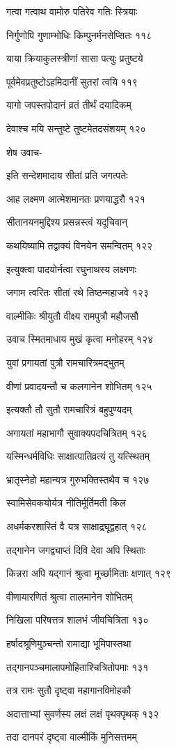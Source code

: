 गत्वा गत्वाथ वामोरु पतिरेव गतिः स्त्रियाः

निर्गुणोपि गुणाम्भोधिः किम्पुनर्मनसेप्सितः ११८

याया क्रियाकुलस्त्रीणां सासा पत्युः प्रतुष्टये

पूर्वमेवप्रतुष्टोऽहमिदानीं सुतरां त्वयि ११९

यागो जपस्तपोदानं व्रतं तीर्थं दयादिकम्

देवाश्च मयि सन्तुष्टे तुष्टमेतदसंशयम् १२०

शेष उवाच-

इति सन्देशमादाय सीतां प्रति जगत्पतेः

आह लक्ष्मण आत्मेशमानतः प्रणयाद्धरौ १२१

सीतानयनमुद्दिश्य प्रसन्नस्त्वं यदूचिवान्

कथयिष्यामि तद्वाक्यं विनयेन समन्वितम् १२२

इत्युक्त्वा पादयोर्नत्वा रघुनाथस्य लक्ष्मणः

जगाम त्वरितः सीतां रथे तिष्ठन्महाजवे १२३

वाल्मीकिः श्रीयुतौ वीक्ष्य रामपुत्रौ महौजसौ

उवाच स्मितमाधाय मुखं कृत्वा मनोहरम् १२४

युवां प्रगायतां पुत्रौ रामचारित्रमद्भुतम्

वीणां प्रवादयन्तौ च कलगानेन शोभितम् १२५

इत्यक्तौ तौ सुतौ रामचारित्रं बहुपुण्यदम्

अगायतां महाभागौ सुवाक्यपदचित्रितम् १२६

यस्मिन्धर्मविधिः साक्षात्पातिव्रत्यं तु यत्स्थितम्

भ्रातृस्नेहो महान्यत्र गुरुभक्तिस्तथैव च १२७

स्वामिसेवकयोर्यत्र नीतिर्मूर्तिमती किल

अधर्मकरशास्तिं वै यत्र साक्षाद्रघूद्वहात् १२८

तद्गानेन जगद्व्याप्तं दिवि देवा अपि स्थिताः

किन्नरा अपि यद्गानं श्रुत्वा मूर्च्छामिताः क्षणात् १२९

वीणायारणितं श्रुत्वा तालमानेन शोभितम्

निखिला परिषत्तत्र शालभं जीवचित्रिता १३०

हर्षादश्रूणिमुञ्चन्तो रामाद्या भूमिपास्तथा

तद्गानपञ्चमालापमोहिताश्चित्रितोपमाः १३१

तत्र रामः सुतौ दृष्ट्वा महागानविमोहकौ

अदात्ताभ्यां सुवर्णस्य लक्षं लक्षं पृथक्पृथक् १३२

तदा दानपरं दृष्ट्वा वाल्मीकिं मुनिसत्तमम्

